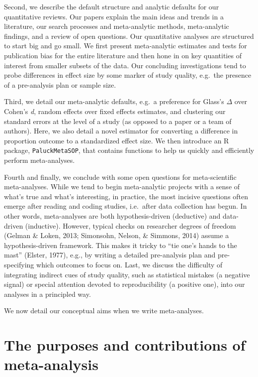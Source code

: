 \documentclass[
  ,jou]{apa6}
\begin{document}
Second, we describe the default structure and analytic defaults for our quantitative reviews. Our papers explain the main ideas and trends in a literature, our search processes and meta-analytic methods, meta-analytic findings, and a review of open questions. Our quantitative analyses are structured to start big and go small. We first present meta-analytic estimates and tests for publication bias for the entire literature and then hone in on key quantities of interest from smaller subsets of the data. Our concluding investigations tend to probe differences in effect size by some marker of study quality, e.g.~the presence of a pre-analysis plan or sample size.

Third, we detail our meta-analytic defaults, e.g.~a preference for Glass's \(\Delta\) over Cohen's \emph{d}, random effects over fixed effects estimates, and clustering our standard errors at the level of a study (as opposed to a paper or a team of authors). Here, we also detail a novel estimator for converting a difference in proportion outcome to a standardized effect size. We then introduce an R package, \texttt{PaluckMetaSOP}, that contains functions to help us quickly and efficiently perform meta-analyses.

Fourth and finally, we conclude with some open questions for meta-scientific meta-analyses. While we tend to begin meta-analytic projects with a sense of what's true and what's interesting, in practice, the most incisive questions often emerge after reading and coding studies, i.e.~after data collection has begun. In other words, meta-analyses are both hypothesis-driven (deductive) and data-driven (inductive). However, typical checks on researcher degrees of freedom (Gelman \& Loken, 2013; Simonsohn, Nelson, \& Simmons, 2014) assume a hypothesis-driven framework. This makes it tricky to ``tie one's hands to the mast'' (Elster, 1977), e.g., by writing a detailed pre-analysis plan and pre-specifying which outcomes to focus on. Last, we discuss the difficulty of integrating indirect cues of study quality, such as statistical mistakes (a negative signal) or special attention devoted to reproducibility (a positive one), into our analyses in a principled way.

We now detail our conceptual aims when we write meta-analyses.

\section{The purposes and contributions of meta-analysis}\label{the-purposes-and-contributions-of-meta-analysis}
\end{document}

